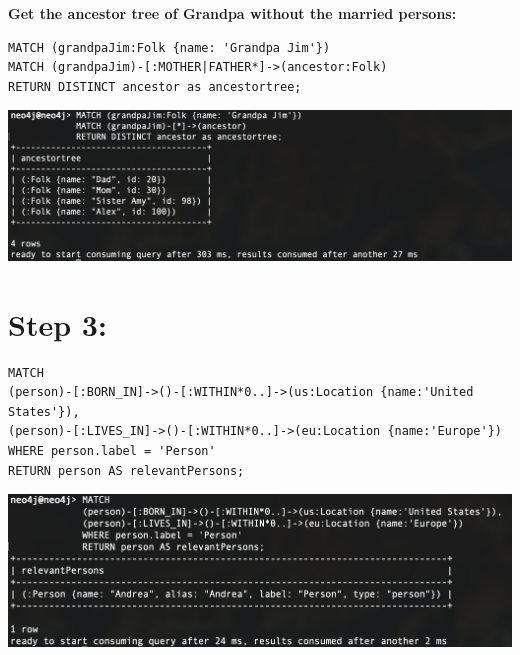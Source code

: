 \documentclass[14pt,a4paper]{extarticle}
\begin{document}
	\noindent \textbf{Get the ancestor tree of Grandpa without the married persons:}
	\begin{lstlisting}[style=sql]
MATCH (grandpaJim:Folk {name: 'Grandpa Jim'})
MATCH (grandpaJim)-[:MOTHER|FATHER*]->(ancestor:Folk)
RETURN DISTINCT ancestor as ancestortree;
	\end{lstlisting}
	\includegraphics[width=\textwidth]{images/sc06.png}



	


	\pagebreak

	\section*{Step 3:}
	\begin{lstlisting}[style=sql]
MATCH
(person)-[:BORN_IN]->()-[:WITHIN*0..]->(us:Location {name:'United States'}),
(person)-[:LIVES_IN]->()-[:WITHIN*0..]->(eu:Location {name:'Europe'})
WHERE person.label = 'Person'
RETURN person AS relevantPersons;
	\end{lstlisting}
	\includegraphics[width=\textwidth]{images/sc-step3.png}
\end{document}

